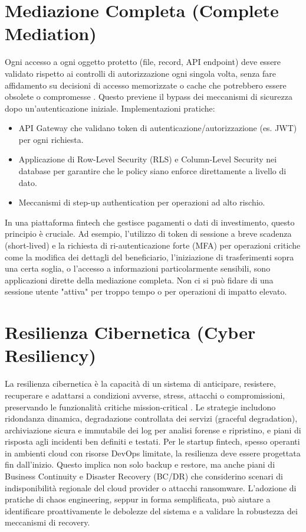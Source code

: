 \section{Mediazione Completa (Complete Mediation)}
Ogni accesso a ogni oggetto protetto (file, record, API endpoint) deve essere validato rispetto ai controlli di autorizzazione ogni singola volta, senza fare affidamento su decisioni di accesso memorizzate o cache che potrebbero essere obsolete o compromesse \cite{Saltzer_Schroeder_1975}. Questo previene il bypass dei meccanismi di sicurezza dopo un'autenticazione iniziale.
Implementazioni pratiche:
\begin{itemize}
\item API Gateway che validano token di autenticazione/autorizzazione (es. JWT) per ogni richiesta.
\item Applicazione di Row-Level Security (RLS) e Column-Level Security nei database per garantire che le policy siano enforce direttamente a livello di dato.
\item Meccanismi di step-up authentication per operazioni ad alto rischio.
\end{itemize}
In una piattaforma fintech che gestisce pagamenti o dati di investimento, questo principio è cruciale. Ad esempio, l'utilizzo di token di sessione a breve scadenza (short-lived) e la richiesta di ri-autenticazione forte (MFA) per operazioni critiche come la modifica dei dettagli del beneficiario, l'iniziazione di trasferimenti sopra una certa soglia, o l'accesso a informazioni particolarmente sensibili, sono applicazioni dirette della mediazione completa. Non ci si può fidare di una sessione utente "attiva" per troppo tempo o per operazioni di impatto elevato.
\section{Resilienza Cibernetica (Cyber Resiliency)}
La resilienza cibernetica è la capacità di un sistema di anticipare, resistere, recuperare e adattarsi a condizioni avverse, stress, attacchi o compromissioni, preservando le funzionalità critiche mission-critical \cite{NIST_SP_800_160v2_2019}. Le strategie includono ridondanza dinamica, degradazione controllata dei servizi (graceful degradation), archiviazione sicura e immutabile dei log per analisi forense e ripristino, e piani di risposta agli incidenti ben definiti e testati.
Per le startup fintech, spesso operanti in ambienti cloud con risorse DevOps limitate, la resilienza deve essere progettata fin dall'inizio. Questo implica non solo backup e restore, ma anche piani di Business Continuity e Disaster Recovery (BC/DR) che considerino scenari di indisponibilità regionale del cloud provider o attacchi ransomware. L'adozione di pratiche di chaos engineering, seppur in forma semplificata, può aiutare a identificare proattivamente le debolezze del sistema e a validare la robustezza dei meccanismi di recovery.
